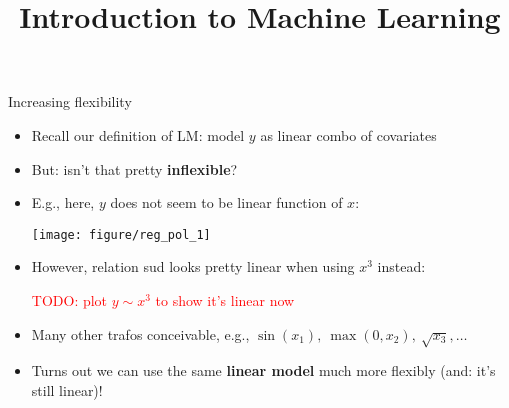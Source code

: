 \documentclass[11pt,compress,t,notes=noshow, xcolor=table]{beamer}
\title{Introduction to Machine Learning}
\institute{\href{https://compstat-lmu.github.io/lecture_i2ml/}{compstat-lmu.github.io/lecture\_i2ml}}
\date{}
\begin{document}


\begin{vbframe}{Increasing flexibility}

\begin{itemize}
    \item Recall our definition of LM: model $y$ as linear combo of covariates
    \item But: isn't that pretty \textbf{inflexible}?
    \item E.g., here, $y$ does not seem to be linear function of $x$:
    
      \texttt{[image: figure/reg\_pol\_1]} 
    \item However, relation sud looks pretty linear when using $x^3$ instead:
    
    \textcolor{red}{TODO: plot $y \sim x^3$ to show it's linear now}
    \item Many other trafos conceivable, e.g., 
    $\sin(x_1), ~ \max(0, x_2), ~ \sqrt{x_3}, \dots$
    \item Turns out we can use the same \textbf{linear model} much more 
    flexibly (and: it's still linear)!
\end{itemize}

\end{vbframe}

\end{document}
